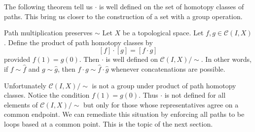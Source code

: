 




The following theorem tell us \(\cdot\) is well defined on the set of homotopy classes of paths. This bring us closer to   the construction of a set with a group operation.

\begin{theorem}{Path multiplication  preserves  \(\sim\)}{}
    Let \(X\) be a topological space. Let \(f,g\in \mathcal{C}(I,X)\). Define the product of path homotopy classes  by \[
        [f] \cdot [g] = [f\cdot g]
    \]   provided \(f(1)=g(0)\). Then \(\cdot\) is well defined on \(\mathcal{C}(I,X)/\!\!\sim\). In other words, if \(f\sim \hat{f}\) and \(g\sim \hat{g}\), then \(f\cdot g\sim \hat{f}\cdot\hat{g}\) whenever concatenations are possible.
\end{theorem}

\begin{remark}
    Unfortunately \(\mathcal{C}(I,X)/\!\!\sim\) is not a group under product of path homotopy classes.  Notice the condition \(f(1)=g(0)\). Thus \(\cdot\) is not defined for all elements of \(\mathcal{C}(I,X)/\!\!\sim\) but  only for those whose representatives agree on a common endpoint. We can remediate this situation by enforcing all paths to be loops based at   a common point. This is the topic of the next section.
\end{remark}

